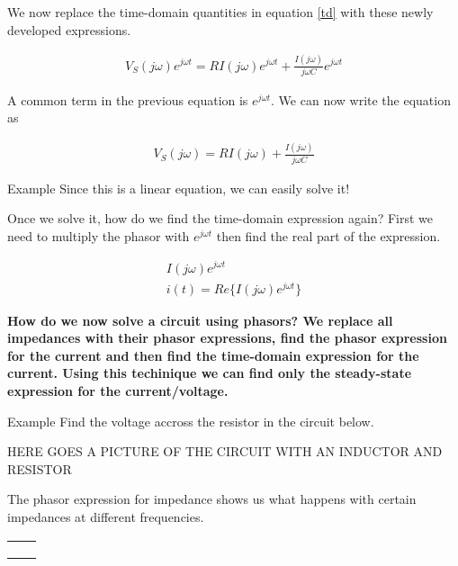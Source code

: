 We now replace the time-domain quantities in equation \ref{td} with
these newly developed expressions.



\begin{eqnarray}
V_S(j \omega)  e^{j\omega t} = R I(j \omega)   e^{j\omega t} +
\frac{I(j \omega)}{j \omega C}   e^{j\omega t}
\end{eqnarray}

A common term in the previous equation is $ e^{j\omega t}$. We can now
write the equation as




\begin{eqnarray}
V_S(j \omega)   = R I(j \omega)    + \frac{I(j \omega )}{j \omega C} 
\end{eqnarray}


{\large Example} 
Since this is a linear equation, we can easily solve it! 

Once we solve it, how do we find the time-domain expression again?
First we need to multiply the phasor with $ e^{j\omega t}$ then find
the real part of the expression.


\begin{eqnarray}
 I(j \omega)  e^{j\omega t} \\
i(t) = Re\{ I(j \omega)  e^{j\omega t} \}
\end{eqnarray}

{\bf How do we now solve a circuit using phasors? We
replace all impedances with their phasor expressions, find the phasor
expression for the current and then find the time-domain expression
for the current. Using this techinique we can find only the
steady-state expression for the current/voltage.}

{\large Example} Find the voltage accross the resistor in the circuit
below.

HERE GOES A PICTURE OF THE CIRCUIT WITH AN INDUCTOR AND RESISTOR


The phasor expression for impedance shows us what happens with certain
impedances at different frequencies.


\begin{center}
\begin{tabular}{|c|c|} \hline
     &     \\  \hline       
     &                                 \\ \hline
     &  \\ \hline          
     &    \\ \hline
\end{tabular}
\end{center}




